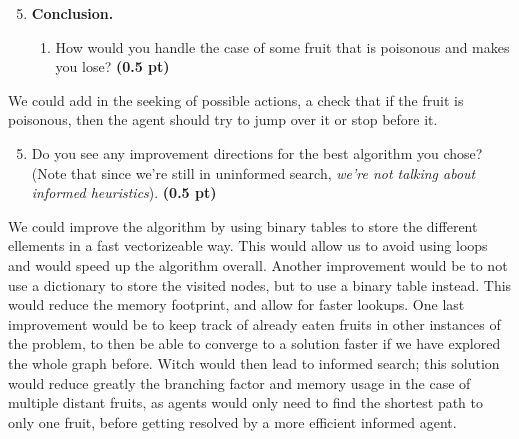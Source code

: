 \documentclass[11pt,a4paper]{../template/report}
\begin{document}
\begin{enumerate}
\setcounter{enumi}{4}
\item \textbf{Conclusion.}
\begin{enumerate}
        \item How would you handle the case of some fruit that is poisonous and makes
you lose?
\textbf{(0.5 pt)}
\end{enumerate}

\end{enumerate}

\begin{answer}
We could add in the seeking of possible actions, a check that if the fruit is poisonous, then the agent should try to jump over it or stop before it.
\end{answer}

\begin{enumerate}
\setcounter{enumi}{4}
\begin{enumerate}
\setcounter{enumii}{4}
        \item  Do you see any improvement directions for the best algorithm you chose? (Note that since we're still in uninformed search, \textit{we're not talking about informed heuristics}). \textbf{(0.5 pt)}
\end{enumerate}

\end{enumerate}

\begin{answer}
We could improve the algorithm by using binary tables to store the different ellements in a fast vectorizeable way. This would allow us to avoid using loops and would speed up the algorithm overall. 
Another improvement would be to not use a dictionary to store the visited nodes, but to use a binary table instead. This would reduce the memory footprint, and allow for faster lookups.
One last improvement would be to keep track of already eaten fruits in other instances of the problem, to then be able to converge to a solution faster if we have explored the whole graph before.
Witch would then lead to informed search; this solution would reduce greatly the branching factor and memory usage in the case of multiple distant fruits, 
as agents would only need to find the shortest path to only one fruit, before getting resolved by a more efficient informed agent.
\end{answer}
\end{document}
